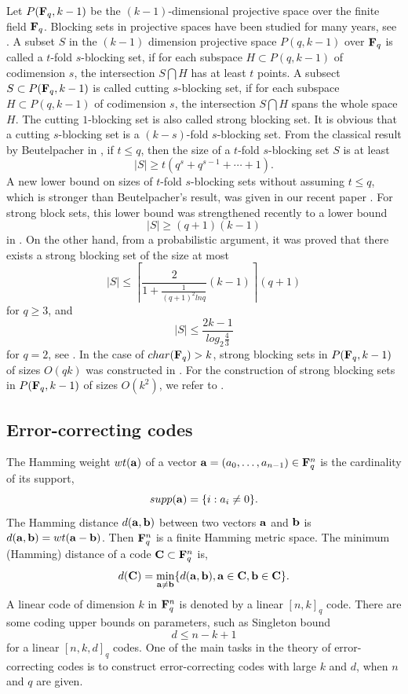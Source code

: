 \documentclass[10pt,a4paper]{article}
\begin{document}
Let $P({\bf F}_q, k-1)$ be the $(k-1)$-dimensional projective space over the finite field ${\bf F}_q$. Blocking sets in projective spaces have been studied for many years, see \cite{BS,Beu,BB}. A subset $S$ in the $(k-1)$ dimension projective space $P(q,k-1)$ over ${\bf F}_q$ is called a $t$-fold $s$-blocking set, if for each subspace $H \subset P(q,k-1)$ of codimension $s$, the intersection $S \bigcap H$ has at least $t$ points. A subsect $S \subset P({\bf F}_q, k-1)$ is called cutting $s$-blocking set, if for each subspace $H \subset P(q,k-1)$ of codimension $s$, the intersection $S \bigcap H$ spans the whole space $H$. The cutting $1$-blocking set is also called strong blocking set. It is obvious that a cutting $s$-blocking set is a $(k-s)$-fold $s$-blocking set. From the classical result by Beutelpacher in \cite{Beu}, if $t \leq q$, then the size of a $t$-fold $s$-blocking set $S$ is at least $$|S| \geq t(q^s+q^{s-1}+\cdots+1).$$ A new lower bound on sizes of $t$-fold $s$-blocking sets without assuming $t \leq q$, which is stronger than Beutelpacher's result,  was given in our recent paper \cite{Pan1}. For strong block sets, this lower bound was strengthened recently to a lower bound $$|S| \geq (q+1)(k-1)$$ in \cite{Alfarano}. On the other hand, from a probabilistic argument, it was proved that there exists a strong blocking set of the size at most $$|S| \leq \left\lceil \frac{2}{1+\frac{1}{(q+1)^2ln q}}(k-1)\right\rceil (q+1)$$ for $q \geq 3$, and $$|S| \leq \frac{2k-1}{log_2\frac{4}{3}}$$ for $q=2$, see \cite{Mik,Alfarano3,Bishnoi,Hegar}. In the case of $char({\bf F}_q)>k$, strong blocking sets in $P({\bf F}_q, k-1)$ of sizes $O(qk)$ was constructed in \cite{FS}. For the construction of strong blocking sets in $P({\bf F}_q,k-1)$ of sizes $O(k^2)$, we refer to \cite{Davy,Alfarano}.\\

\subsection{Error-correcting codes}



The Hamming weight $wt({\bf a})$ of a vector ${\bf a}=(a_0, \ldots, a_{n-1}) \in {\bf F}_q^n$ is the cardinality of its support, $$supp({\bf a})=\{i: a_i \neq 0\}.$$ The Hamming distance $d({\bf a}, {\bf b})$ between two vectors ${\bf a}$ and ${\bf b}$ is $d({\bf a}, {\bf b})=wt({\bf a}-{\bf b})$. Then ${\bf F}_q^n$ is a finite Hamming metric space. The minimum (Hamming) distance of a code ${\bf C} \subset {\bf F}_q^n$ is, $$d({\bf C})=\min_{{\bf a} \neq {\bf b}} \{d({\bf a}, {\bf b}),  {\bf a} \in {\bf C}, {\bf b} \in {\bf C} \}.$$ A linear code of dimension $k$ in ${\bf F}_q^n$ is denoted by a linear $[n,k]_q$ code. There are some coding upper bounds on parameters, such as Singleton bound $$d \leq n-k+1$$ for a linear $[n,k,d]_q$ codes. One of the main tasks in the theory of error-correcting codes is to construct error-correcting codes with large $k$ and $d$, when $n$ and $q$ are given.\\
\end{document}
